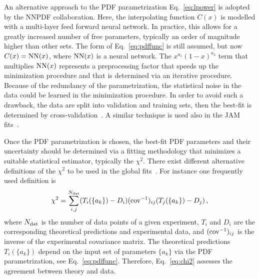 An alternative approach to the PDF parametrization Eq.~\eqref{eq:lpower}
is adopted by the NNPDF collaboration. 
%
Here, the interpolating function $C(x)$ is modelled with 
a multi-layer feed forward neural network.
%
In practice, this allows for a greatly increased number of free parameters, 
typically an order of magnitude higher than other sets.
%
The form of Eq.~\eqref{eq:pdffunc} is still assumed, but
now $C(x)={\rm NN}(x)$, where ${\rm NN}(x)$ is a neural network.
%
The $x^{a_1}(1-x)^{a_2}$ term that multiplies ${\rm NN}(x)$ represents
a preprocessing factor that speeds up the minimization procedure
and that is determined via an iterative procedure.
%
Because of the redundancy of the parametrization, the statistical noise in 
the data could be learned in the minimization procedure.
%
In order to avoid such a drawback, the data are split into validation and 
training sets, then the best-fit is determined by
cross-validation~\cite{Forte:2002fg,DelDebbio:2004xtd}.
%
A similar technique is used also in the JAM 
fits~\cite{Sato:2016tuz,Ethier:2017zbq}.

Once the PDF parametrization is chosen, the best-fit PDF parameters
and their uncertainty should be determined via a fitting methodology
that minimizes a suitable statistical estimator, typically the $\chi^2$.
%
There exist different alternative definitions of the $\chi^2$
to be used in the global fits~\cite{Ball:2012wy}. 
%
For instance one frequently used definition is
\begin{equation}
\chi^2 
= 
\sum_{i,j}^{N_{\rm dat}} (T_i(\{a_k\}) - D_i) 
({\rm cov^{-1}})_{ij} (T_j(\{a_k\}) - D_j)\,,
\label{eq:chi2}
\end{equation}
where $N_{\rm dat}$ is the number of data points of a given experiment,
$T_i$ and $D_i$ are the corresponding theoretical predictions
and experimental data, and $({\rm cov^{-1}})_{ij}$ is the inverse of the 
experimental covariance matrix.
%
The theoretical predictions $T_i(\{a_k\})$ depend on the input set of 
parameters $\{a_k\}$ via the PDF parametrization, see Eq.~\eqref{eq:pdffunc}.
%
Therefore, Eq.~\eqref{eq:chi2} assesses the agreement between theory and data.

